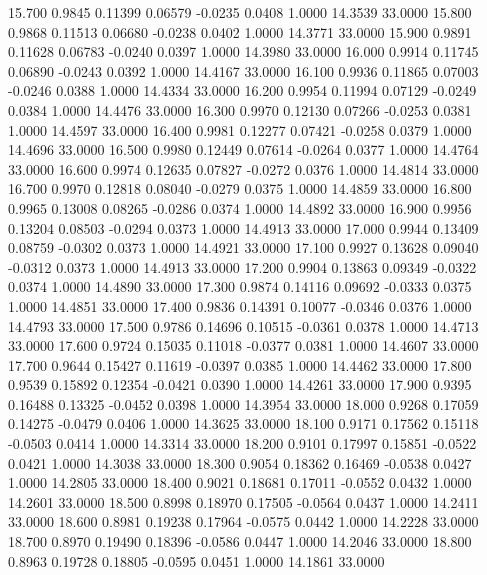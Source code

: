   15.700   0.9845   0.11399   0.06579  -0.0235   0.0408   1.0000  14.3539  33.0000
  15.800   0.9868   0.11513   0.06680  -0.0238   0.0402   1.0000  14.3771  33.0000
  15.900   0.9891   0.11628   0.06783  -0.0240   0.0397   1.0000  14.3980  33.0000
  16.000   0.9914   0.11745   0.06890  -0.0243   0.0392   1.0000  14.4167  33.0000
  16.100   0.9936   0.11865   0.07003  -0.0246   0.0388   1.0000  14.4334  33.0000
  16.200   0.9954   0.11994   0.07129  -0.0249   0.0384   1.0000  14.4476  33.0000
  16.300   0.9970   0.12130   0.07266  -0.0253   0.0381   1.0000  14.4597  33.0000
  16.400   0.9981   0.12277   0.07421  -0.0258   0.0379   1.0000  14.4696  33.0000
  16.500   0.9980   0.12449   0.07614  -0.0264   0.0377   1.0000  14.4764  33.0000
  16.600   0.9974   0.12635   0.07827  -0.0272   0.0376   1.0000  14.4814  33.0000
  16.700   0.9970   0.12818   0.08040  -0.0279   0.0375   1.0000  14.4859  33.0000
  16.800   0.9965   0.13008   0.08265  -0.0286   0.0374   1.0000  14.4892  33.0000
  16.900   0.9956   0.13204   0.08503  -0.0294   0.0373   1.0000  14.4913  33.0000
  17.000   0.9944   0.13409   0.08759  -0.0302   0.0373   1.0000  14.4921  33.0000
  17.100   0.9927   0.13628   0.09040  -0.0312   0.0373   1.0000  14.4913  33.0000
  17.200   0.9904   0.13863   0.09349  -0.0322   0.0374   1.0000  14.4890  33.0000
  17.300   0.9874   0.14116   0.09692  -0.0333   0.0375   1.0000  14.4851  33.0000
  17.400   0.9836   0.14391   0.10077  -0.0346   0.0376   1.0000  14.4793  33.0000
  17.500   0.9786   0.14696   0.10515  -0.0361   0.0378   1.0000  14.4713  33.0000
  17.600   0.9724   0.15035   0.11018  -0.0377   0.0381   1.0000  14.4607  33.0000
  17.700   0.9644   0.15427   0.11619  -0.0397   0.0385   1.0000  14.4462  33.0000
  17.800   0.9539   0.15892   0.12354  -0.0421   0.0390   1.0000  14.4261  33.0000
  17.900   0.9395   0.16488   0.13325  -0.0452   0.0398   1.0000  14.3954  33.0000
  18.000   0.9268   0.17059   0.14275  -0.0479   0.0406   1.0000  14.3625  33.0000
  18.100   0.9171   0.17562   0.15118  -0.0503   0.0414   1.0000  14.3314  33.0000
  18.200   0.9101   0.17997   0.15851  -0.0522   0.0421   1.0000  14.3038  33.0000
  18.300   0.9054   0.18362   0.16469  -0.0538   0.0427   1.0000  14.2805  33.0000
  18.400   0.9021   0.18681   0.17011  -0.0552   0.0432   1.0000  14.2601  33.0000
  18.500   0.8998   0.18970   0.17505  -0.0564   0.0437   1.0000  14.2411  33.0000
  18.600   0.8981   0.19238   0.17964  -0.0575   0.0442   1.0000  14.2228  33.0000
  18.700   0.8970   0.19490   0.18396  -0.0586   0.0447   1.0000  14.2046  33.0000
  18.800   0.8963   0.19728   0.18805  -0.0595   0.0451   1.0000  14.1861  33.0000
